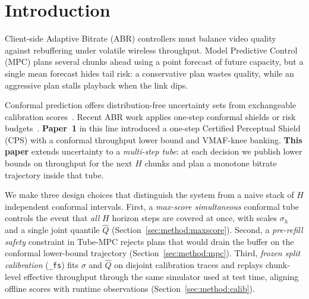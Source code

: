 \section{Introduction}
\label{sec:intro}

Client-side Adaptive Bitrate (ABR) controllers must balance video quality against rebuffering under volatile wireless throughput.
Model Predictive Control (MPC) plans several chunks ahead using a point forecast of future capacity, but a single mean forecast hides tail risk: a conservative plan wastes quality, while an aggressive plan stalls playback when the link dips.

Conformal prediction offers distribution-free uncertainty sets from exchangeable calibration scores~\cite{vovk2005algorithmic,angelopoulos2023gentle}.
Recent ABR work applies one-step conformal shields or risk budgets~\cite{zhong2026conformalabr,liu2025safesabr}.
\textbf{Paper~1} in this line introduced a one-step Certified Perceptual Shield (CPS) with a conformal throughput lower bound and VMAF-knee banking.
\textbf{This paper} extends uncertainty to a \emph{multi-step tube}: at each decision we publish lower bounds on throughput for the next \(H\) chunks and plan a monotone bitrate trajectory inside that tube.

We make three design choices that distinguish the system from a naive stack of \(H\) independent conformal intervals.
First, a \emph{max-score simultaneous} conformal tube controls the event that \emph{all} \(H\) horizon steps are covered at once, with scales \(\sigma_h\) and a single joint quantile \(\widehat Q\) (Section~\ref{sec:method:maxscore}).
Second, a \emph{pre-refill safety} constraint in Tube-MPC rejects plans that would drain the buffer on the conformal lower-bound trajectory (Section~\ref{sec:method:mpc}).
Third, \emph{frozen split calibration} (\texttt{\_fs}) fits \(\sigma\) and \(\widehat Q\) on disjoint calibration traces and replays chunk-level effective throughput through the same simulator used at test time, aligning offline scores with runtime observations (Section~\ref{sec:method:calib}).

